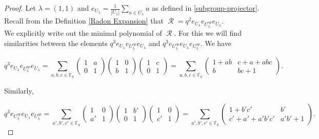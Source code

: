 \documentclass[12pt,reqno]{amsart}
\theoremstyle{definition}
\theoremstyle{remark}
\numberwithin{equation}{section}
\DeclareMathOperator{\R}{\mathcal{R}}
\begin{document}
\begin{proof}
Let $\lambda=(1,1)$ and $e_{U_{\lambda}}=\frac{1}{|U_{\lambda}|}\sum_{u \in U_\lambda} u$ as defined in \ref{subgroup-projector}. Recall from the Definition \ref{Radon Expansion} that $\R =q^2 e_{U_{\lambda}}e_{U_{\lambda}^{op}}e_{U_{\lambda}}$.\\


We explicitly write out the minimal polynomial of $\R$. For this we will find similarities between the elements $q^3 e_{U_{\lambda}}e_{U_{\lambda}^{op}}e_{U_{\lambda}}$ and $q^3 e_{U_{\lambda}^{op}}e_{U_{\lambda}}e_{U_{\lambda}^{op}}$. We have

\[q^3 e_{U_{\lambda}}e_{U_{\lambda}^{op}}e_{U_{\lambda}} = \sum_{a, b, c \in \mathbb{F}_q} 
\begin{pmatrix}
1 & a \\
0 & 1 
\end{pmatrix}
\begin{pmatrix}
1 & 0 \\
b & 1 
\end{pmatrix}
\begin{pmatrix}
1 & c \\
0 & 1 
\end{pmatrix}
= \sum_{a, b, c \in \mathbb{F}_q} 
\begin{pmatrix}
1+ab & c+a+abc \\
b & bc+1 
\end{pmatrix}.\]

Similarly,

\[q^3 e_{U_{\lambda}^{op}}e_{U_{\lambda}}e_{U_{\lambda}^{op}} = \sum_{a', b', c' \in \mathbb{F}_q} 
\begin{pmatrix}
1 & 0 \\
a' & 1 
\end{pmatrix}
\begin{pmatrix}
1 & b' \\
0 & 1 
\end{pmatrix}
\begin{pmatrix}
1 & 0 \\
c' & 1 
\end{pmatrix}
= \sum_{a', b', c' \in \mathbb{F}_q} 
\begin{pmatrix}
1+b'c' & b' \\
c'+a'+a'b'c' & a'b'+1 
\end{pmatrix}.\]


\end{proof}
\end{document}
